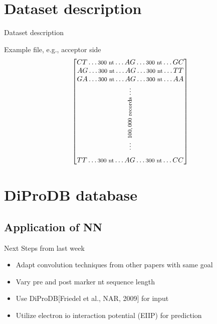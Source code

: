 \documentclass[10pt]{beamer}
\begin{document}
\section{Dataset description}
\begin{frame}{Dataset description}
	
	\large Example file, e.g., acceptor side
	\begin{align*}
	\begin{bmatrix}
	CT \dots \rotatebox{0}{\footnotesize $ 300 $ nt} \dots AG \dots \rotatebox{0}{\footnotesize $ 300 $ nt} \dots GC\\
	AG \dots \rotatebox{0}{\footnotesize $ 300 $ nt} \dots AG \dots \rotatebox{0}{\footnotesize $ 300 $ nt} \dots TT \\
	GA \dots \rotatebox{0}{\footnotesize $ 300 $ nt} \dots AG \dots \rotatebox{0}{\footnotesize $ 300 $ nt} \dots AA \\[0.2ex]
	\vdots\\
	\rotatebox{90}{\footnotesize$ ~100,000 $ records} \\[-1.3ex]
	\vdots \\[1.4ex]
	TT \dots \rotatebox{0}{\footnotesize $ 300 $ nt} \dots AG \dots \rotatebox{0}{\footnotesize $ 300 $ nt} \dots CC
	\end{bmatrix}
	\end{align*}
\end{frame}

\section{DiProDB database}
\subsection{Application of NN}
\begin{frame}{Next Steps from last week}
	\begin{itemize}
		\item Adapt convolution techniques from other papers with same goal
		\item Vary pre and post marker nt sequence length
		\item Use DiProDB[Friedel et al., NAR, 2009] for input
		\item Utilize electron io interaction potential (EIIP) for prediction
	\end{itemize}
\end{frame}
\end{document}
